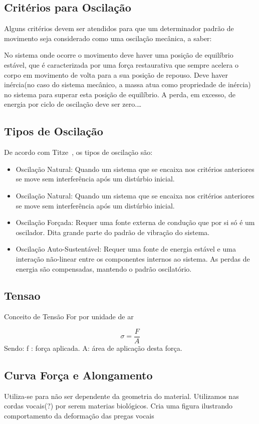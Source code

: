 	\subsection{Critérios para Oscilação}
		Alguns critérios devem ser atendidos para que um determinador padrão de movimento seja considerado como uma oscilação mecânica, a saber:
		
		
		No sistema onde ocorre o movimento deve haver uma posição de equilíbrio estável, que é caracterizada por uma força restaurativa que sempre acelera o corpo em	movimento de volta para a sua posição de repouso.
		Deve haver inércia(no caso do sistema mecânico, a massa atua como propriedade de inércia) no sistema para superar esta posição de equilíbrio.
		A perda, em excesso, de energia por ciclo de oscilação deve ser zero.\ldots 
	
	\subsection{Tipos de Oscilação}
			De acordo com Titze~\cite{IngoTitze}, os tipos de oscilação são:
			\begin{itemize}
				\item  Oscilação Natural: Quando um sistema que se encaixa nos critérios anteriores se move sem interferência após um distúrbio inicial.
				\item Oscilação Natural: Quando um sistema que se encaixa nos critérios anteriores se move sem interferência após um distúrbio inicial.
				\item Oscilação Forçada: Requer uma fonte externa de condução que por si só é um
				oscilador. Dita grande parte do padrão de vibração do sistema.
				\item Oscilação Auto-Sustentável: Requer uma fonte de energia estável e uma interação não-linear entre os componentes internos ao sistema. As perdas de energia são compensadas, mantendo o padrão oscilatório.
			\end{itemize}
		
	\subsection{Tensao}
		Conceito de Tensão For por unidade de ar
		
		\[
		\sigma = \frac{F}{A}
		\]
		Sendo:
		f : força aplicada. \linebreak
		A: área de aplicação desta força.
		
	\subsection{Curva Força e Alongamento}
		Utiliza-se para não ser dependente da geometria do material. Utilizamos nas cordas vocais(?) por serem materias biológicos. Cria uma figura ilustrando comportamento da deformação das pregas vocais
		
